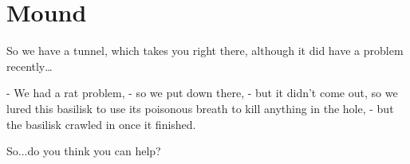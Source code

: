 \section{Mound}

So we have a tunnel, which takes you right there, although it did have a problem recently\ldots

- We had a rat problem,
- so we put  down there,
- but it didn't come out, so we lured this basilisk to use its poisonous breath to kill anything in the hole,
- but the basilisk crawled in once it finished.

So...do you think you can help?
